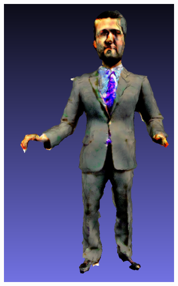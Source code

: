 \begin{figure}[H]
\begin{subfigure}[b]{0.114\textwidth}
        \caption{}
    \end{subfigure}
    \begin{subfigure}[b]{0.2059\textwidth}
        \centering
        \includegraphics[width=\textwidth]{etc/bias/bias_ceo_fantasia3d.png}
        \caption{}
    \end{subfigure}
    \begin{subfigure}[b]{0.106\textwidth}
        \centering

\end{subfigure}
\end{figure}
